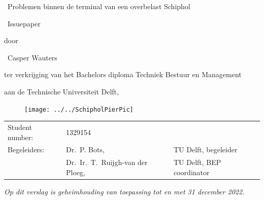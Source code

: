 \begin{titlepage}


\begin{center}


{\makeatletter
\largetitlestyle\fontsize{32}{94}\selectfont\ Problemen binnen de terminal van een overbelast Schiphol
\makeatother}

{\makeatletter
\ifx\@subtitle\undefined\else
    \bigskip
   {\tudsffamily\fontsize{22}{32}\selectfont\ Issuepaper}    
\fi
\makeatother}

\bigskip
\bigskip

door

\bigskip
\bigskip

{\makeatletter
\largetitlestyle\fontsize{26}{26}\selectfont\ Casper Wauters
\makeatother}

\bigskip
\bigskip

ter verkrijging van het Bachelors diploma Techniek Bestuur en Management 

aan de Technische Universiteit Delft,

\begin{figure}[h]
	\centering
	\texttt{[image: ../../SchipholPierPic]}
	\caption{}
	\label{fig:schipholpierpic}
\end{figure}

\vfill

\begin{tabular}{lll}
    Student number: & 1329154 \\
    Begeleiders: & Dr.\ P. Bots, & TU Delft, begeleider \\
        & Dr.\ Ir.\ T.\ Ruijgh-van der Ploeg, & TU Delft, BEP coordinator \\
\end{tabular}

\bigskip
\bigskip
\emph{Op dit verslag is geheimhouding van toepassing tot en met 31 december 2022.}


\end{center}
\end{titlepage}
